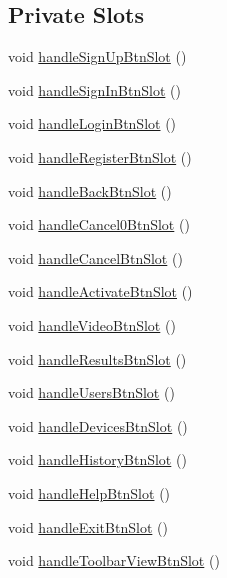 \subsection*{Private Slots}
\begin{DoxyCompactItemize}
\item 
void \hyperlink{class_master_gui_a551dd5376b4fe1b8481cf5389611b780}{handle\-Sign\-Up\-Btn\-Slot} ()
\item 
void \hyperlink{class_master_gui_afa3826a40415ae50f61a08f48232035b}{handle\-Sign\-In\-Btn\-Slot} ()
\item 
void \hyperlink{class_master_gui_a4d9ea1e7af66093ff307b8a832350a4f}{handle\-Login\-Btn\-Slot} ()
\item 
void \hyperlink{class_master_gui_ad42fc0777b331eb61eda315cf9ded6f6}{handle\-Register\-Btn\-Slot} ()
\item 
void \hyperlink{class_master_gui_a2e9b9de115d44f04ba3da2c965f60816}{handle\-Back\-Btn\-Slot} ()
\item 
void \hyperlink{class_master_gui_a42e6c23c4d7ef18e245dbabcca7fa67a}{handle\-Cancel0\-Btn\-Slot} ()
\item 
void \hyperlink{class_master_gui_acde9d054d30c33783e809f5ca7591055}{handle\-Cancel\-Btn\-Slot} ()
\item 
void \hyperlink{class_master_gui_a366198accc8c0f5baf7abd9ec291c6cd}{handle\-Activate\-Btn\-Slot} ()
\item 
void \hyperlink{class_master_gui_a49907066b49f8b844892c0a30ea4576b}{handle\-Video\-Btn\-Slot} ()
\item 
void \hyperlink{class_master_gui_a8abb5791d6d76377da005631250ca3e8}{handle\-Results\-Btn\-Slot} ()
\item 
void \hyperlink{class_master_gui_a45376186409ece6660475a724b75330d}{handle\-Users\-Btn\-Slot} ()
\item 
void \hyperlink{class_master_gui_a64741e8bdb9f3d179eb6a01f58e5a56e}{handle\-Devices\-Btn\-Slot} ()
\item 
void \hyperlink{class_master_gui_ad36d566140ec3ab0f2393bddf88639cc}{handle\-History\-Btn\-Slot} ()
\item 
void \hyperlink{class_master_gui_a58ecf3c83023706cf9bc3b53aa255e25}{handle\-Help\-Btn\-Slot} ()
\item 
void \hyperlink{class_master_gui_a64e1a89f50535a3cb03066b7a8cc69d8}{handle\-Exit\-Btn\-Slot} ()
\item 
void \hyperlink{class_master_gui_afa9fabec09189c4b3f593ced2d79a542}{handle\-Toolbar\-View\-Btn\-Slot} ()
\item 

\end{DoxyCompactItemize}
